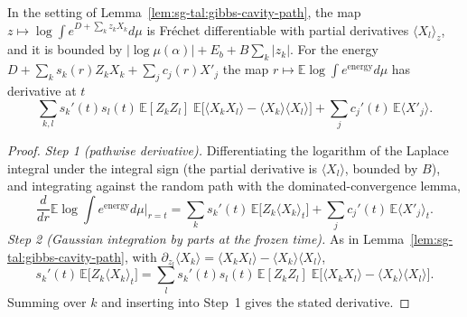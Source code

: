 \begin{theorem}\label{thm:sg-tal:log-partition-cavity}
\leanok
{}
In the setting of Lemma~\ref{lem:sg-tal:gibbs-cavity-path}, the map $z\mapsto\log\int e^{D+\sum_kz_kX_k}d\mu$ is Fr\'echet differentiable with partial derivatives $\langle X_l\rangle_z$, and it is bounded by $|\log\mu(\alpha)|+E_b+B\sum_k|z_k|$. For the energy $D+\sum_ks_k(r)Z_kX_k+\sum_jc_j(r)X'_j$ the map $r\mapsto\mathbb E\log\int e^{\mathrm{energy}}d\mu$ has derivative at $t$
\[
\sum_{k,l}s_k'(t)s_l(t)\,\mathbb E[Z_kZ_l]\;\mathbb E\bigl[\langle X_kX_l\rangle-\langle X_k\rangle\langle X_l\rangle\bigr]+\sum_jc_j'(t)\,\mathbb E\langle X'_j\rangle .
\]
\end{theorem}
\begin{proof}
\leanok
\emph{Step 1 (pathwise derivative).} Differentiating the logarithm of the Laplace integral under the integral sign (the partial derivative is $\langle X_l\rangle$, bounded by $B$), and integrating against the random path with the dominated-convergence lemma,
\[
\frac d{dr}\mathbb E\log\int e^{\mathrm{energy}}d\mu\Big|_{r=t}=\sum_ks_k'(t)\,\mathbb E\big[Z_k\langle X_k\rangle_t\big]+\sum_jc_j'(t)\,\mathbb E\langle X'_j\rangle_t .
\]
\emph{Step 2 (Gaussian integration by parts at the frozen time).} As in Lemma~\ref{lem:sg-tal:gibbs-cavity-path}, with $\partial_{z_l}\langle X_k\rangle=\langle X_kX_l\rangle-\langle X_k\rangle\langle X_l\rangle$,
\[
s_k'(t)\,\mathbb E\big[Z_k\langle X_k\rangle_t\big]=\sum_l s_k'(t)s_l(t)\,\mathbb E[Z_kZ_l]\;\mathbb E\big[\langle X_kX_l\rangle-\langle X_k\rangle\langle X_l\rangle\big].
\]
Summing over $k$ and inserting into Step~1 gives the stated derivative.
\end{proof}

